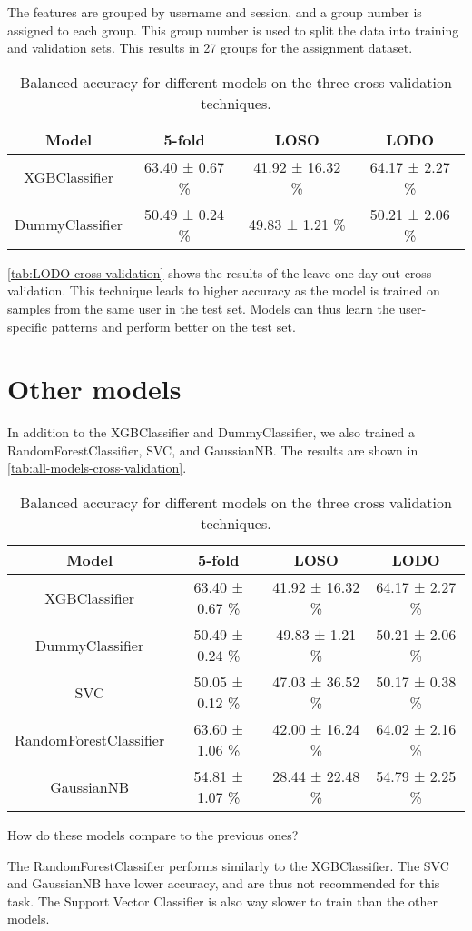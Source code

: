 \documentclass{usireport}
\begin{document}
The features are grouped by username and session, and a group number is assigned to each group. This group number is used to split the data into training and validation sets. This results in 27 groups for the assignment dataset.

\begin{table}[H]
    \centering
    \begin{tabular}{|c|c|c|c|}
        \hline
        \textbf{Model} & \textbf{5-fold} & \textbf{LOSO} & \textbf{LODO} \\
        \hline
        XGBClassifier & 63.40 ± 0.67 \% & 41.92 ± 16.32 \% & 64.17 ± 2.27 \% \\
        DummyClassifier & 50.49 ± 0.24 \% & 49.83 ± 1.21 \% & 50.21 ± 2.06 \% \\

        \hline
    \end{tabular}
    \caption{Balanced accuracy for different models on the three cross validation techniques.}
    \label{tab:LODO-cross-validation}
\end{table}

\autoref{tab:LODO-cross-validation} shows the results of the leave-one-day-out cross validation. This technique leads to higher accuracy as the model is trained on samples from the same user in the test set. Models can thus learn the user-specific patterns and perform better on the test set.

\section{Other models}

In addition to the XGBClassifier and DummyClassifier, we also trained a RandomForestClassifier, SVC, and GaussianNB. The results are shown in \autoref{tab:all-models-cross-validation}.

\begin{table}[H]
    \centering
    \begin{tabular}{|c|c|c|c|}
        \hline
        \textbf{Model} & \textbf{5-fold} & \textbf{LOSO} & \textbf{LODO} \\
        \hline
        XGBClassifier & 63.40 ± 0.67 \% & 41.92 ± 16.32 \% & 64.17 ± 2.27 \% \\
        DummyClassifier & 50.49 ± 0.24 \% & 49.83 ± 1.21 \% & 50.21 ± 2.06 \% \\
        SVC & 50.05 ± 0.12 \% & 47.03 ± 36.52 \% & 50.17 ± 0.38 \% \\
        RandomForestClassifier & 63.60 ± 1.06 \% & 42.00 ± 16.24 \% & 64.02 ± 2.16 \% \\
        GaussianNB & 54.81 ± 1.07 \% & 28.44 ± 22.48 \% & 54.79 ± 2.25 \% \\
        \hline
    \end{tabular}
    \caption{Balanced accuracy for different models on the three cross validation techniques.}
    \label{tab:all-models-cross-validation}
\end{table}

How do these models compare to the previous ones?

The RandomForestClassifier performs similarly to the XGBClassifier. The SVC and GaussianNB have lower accuracy, and are thus not recommended for this task. The Support Vector Classifier is also way slower to train than the other models.
\end{document}

